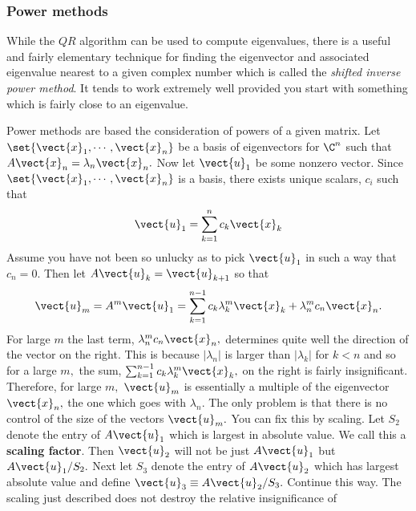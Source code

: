\subsubsection{Power methods}

While the $QR$ algorithm can be used to compute eigenvalues, there is a useful and fairly elementary technique for
finding the eigenvector and associated eigenvalue nearest to a given complex number which
is called the {\em shifted inverse power method}. It tends to work extremely well provided you
start with something which is fairly close to an eigenvalue.

Power methods are based the consideration of powers of a given matrix. Let $
\set{
\vect{x}_{1},\cdots ,\vect{x}_{n}} $ be a basis of eigenvectors for $
\C^{n}$ such that $A\vect{x}_{n}=\lambda _{n}\vect{x}_{n}.$ Now let $
\vect{u}_{1}$ be some nonzero vector. Since $\set{\vect{x}_{1},\cdots ,\vect{x}_{n}} $ is a basis, there exists unique scalars, $c_{i}$ such that 
\begin{equation*}
\vect{u}_{1}=\sum_{k=1}^{n}c_{k}\vect{x}_{k}
\end{equation*}
Assume you have not been so unlucky as to pick $\vect{u}_{1}$ in such a way
that $c_{n}=0.$ Then let $A\vect{u}_{k}=\vect{u}_{k+1}$ so that 
\begin{equation}
\vect{u}_{m}=A^{m}\vect{u}_{1}=\sum_{k=1}^{n-1}c_{k}\lambda _{k}^{m}\vect{x}
_{k}+\lambda _{n}^{m}c_{n}\vect{x}_{n}.  \label{20maye1}
\end{equation}
For large $m$ the last term, $\lambda _{n}^{m}c_{n}\vect{x}_{n},$ determines
quite well the direction of the vector on the right. This is because $
\left\vert \lambda _{n}\right\vert $ is larger than $\left\vert \lambda
_{k}\right\vert $ for $k<n$ and so for a large $m,$ the sum, $\sum_{k=1}^{n-1}c_{k}\lambda _{k}^{m}\vect{x}_{k},$ on the right is fairly
insignificant. Therefore, for large $m,$ $\vect{u}_{m}$ is essentially a
multiple of the eigenvector $\vect{x}_{n},$ the one which goes with $\lambda
_{n}.$ The only problem is that there is no control of the size of the
vectors $\vect{u}_{m}.$ You can fix this by scaling. Let $S_{2}$ denote the
entry of $A\vect{u}_{1}$ which is largest in absolute value. We call this a 
 \textbf{scaling factor}. Then $\vect{u}_{2}$ will not be just $A\vect{u}_{1}$ but $A\vect{u}_{1}/S_{2}.$ Next
let $S_{3}$ denote the entry of $A\vect{u}_{2}$ which has largest absolute
value and define $\vect{u}_{3}\equiv A\vect{u}_{2}/S_{3}.$ Continue this way.
The scaling just described does not destroy the relative insignificance of
